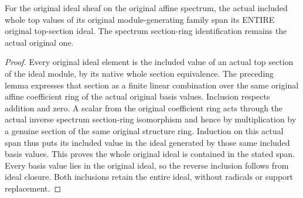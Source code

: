 \begin{lemma}
\leanok
\label{lem:kn-nadel-nef-big-affine-ideal-generators}
For the original ideal sheaf on the original affine spectrum, the actual
included whole top values of its original module-generating family span
its ENTIRE original top-section ideal. The spectrum section-ring
identification remains the actual original one.
\end{lemma}
\begin{proof}
Every original ideal element is the included value of an actual top
section of the ideal module, by its native whole section equivalence.
The preceding lemma expresses that section as a finite linear combination
over the same original affine coefficient ring of the actual original
basis values. Inclusion respects addition and zero. A scalar from the
original coefficient ring acts through the actual inverse spectrum
section-ring isomorphism and hence by multiplication by a genuine section
of the same original structure ring. Induction on this actual span thus
puts its included value in the ideal generated by those same included
basis values. This proves the whole original ideal is contained in the
stated span. Every basis value lies in the original ideal, so the reverse
inclusion follows from ideal closure. Both inclusions retain the entire
ideal, without radicals or support replacement.
\end{proof}

